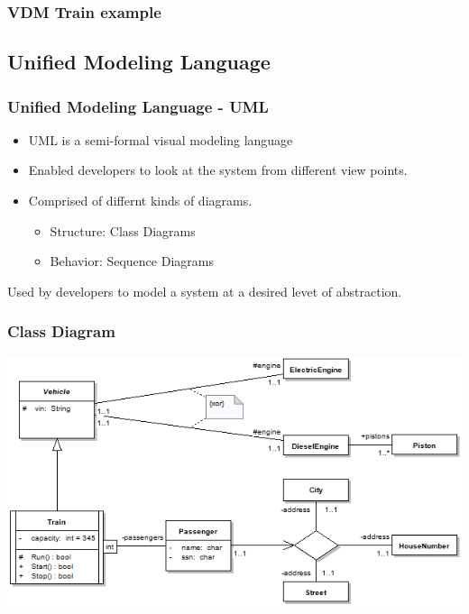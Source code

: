 %
%
\frame
{
  \frametitle{VDM Train example}

\begin{center}


\end{center}
}

\subsection{Unified Modeling Language}
%
%
\frame
{
  \frametitle{Unified Modeling Language - UML}

	\begin{itemize}
  		\item<1-> UML is a semi-formal visual modeling language
  		\item<2-> Enabled developers to look at the system from different view points.
  		\item<3-> Comprised of differnt kinds of diagrams.
		\begin{itemize}
				\item Structure: Class Diagrams
				\item Behavior: Sequence Diagrams
		\end{itemize}
  		 
	  	
  \end{itemize}

}

\note
{
Used by developers to model a system at a desired levet of abstraction.



}


%
%
\frame
{
  \frametitle{Class Diagram}

\begin{center}

\includegraphics[width=\textwidth]{images/ClassDiagramOverview.png}

\end{center}
}

